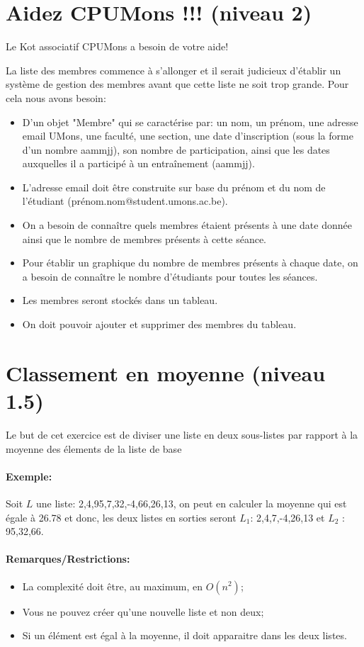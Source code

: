 \documentclass[a4paper]{article}
\begin{document}
\section{Aidez CPUMons !!! (niveau 2)}
Le Kot associatif CPUMons a besoin de votre aide! 

La liste des membres commence à s'allonger et il serait judicieux d'établir un système de gestion des membres avant que cette liste ne soit trop grande.
Pour cela nous avons besoin:
\begin{itemize}
\item D'un objet "Membre" qui se caractérise par: un nom, un prénom, une adresse email UMons, une faculté, une section, une date d'inscription (sous la forme d'un nombre aammjj), son nombre de participation, ainsi que les dates auxquelles il a participé à un entraînement (aammjj).
\item L'adresse email doit être construite sur base du prénom et du nom de l'étudiant (prénom.nom@student.umons.ac.be).
\item On a besoin de connaître quels membres étaient présents à une date donnée ainsi que le nombre de membres présents à cette séance.
\item Pour établir un graphique du nombre de membres présents à chaque date, on a besoin de connaître le nombre d'étudiants pour toutes les séances.
\item Les membres seront stockés dans un tableau.
\item On doit pouvoir ajouter et supprimer des membres du tableau.
\end{itemize}

\section{Classement en moyenne (niveau 1.5)}
Le but de cet exercice est de diviser une liste en deux sous-listes par rapport à la moyenne des élements de la liste de base
\paragraph{Exemple: }
Soit $L$ une liste: {2,4,95,7,32,-4,66,26,13}, on peut en calculer la moyenne qui est égale à 26.78 et donc, les deux listes en sorties seront $L_1$: {2,4,7,-4,26,13} et $L_2$ : {95,32,66}.
\paragraph{Remarques/Restrictions: }
\begin{itemize}
\item La complexité doit être, au maximum, en $O(n^2)$;
\item Vous ne pouvez créer qu'une nouvelle liste et non deux;
\item Si un élément est égal à la moyenne, il doit apparaitre dans les deux listes.
\end{itemize}
\end{document}
